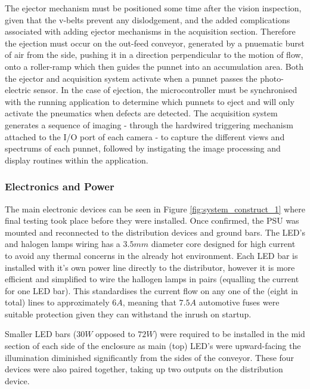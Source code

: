 \documentclass[fleqn,twoside]{article}
\begin{document}
The ejector mechanism must be positioned some time after the vision inspection, given that the v-belts prevent any dislodgement, and the added complications associated with adding ejector mechanisms in the acquisition section. Therefore the ejection must occur on the out-feed conveyor, generated by a pnuematic burst of air from the side, pushing it in a direction perpendicular to the motion of flow, onto a roller-ramp which then guides the punnet into an accumulation area. Both the ejector and acquisition system activate when a punnet passes the photo-electric sensor. In the case of ejection, the microcontroller must be synchronised with the running application to determine which punnets to eject and will only activate the pneumatics when defects are detected. The acquisition system generates a sequence of imaging - through the hardwired triggering mechanism attached to the I/O port of each camera - to capture the different views and spectrums of each punnet, followed by instigating the image processing and display routines within the application. 


\subsubsection{Electronics and Power}


The main electronic devices can be seen in Figure \ref{fig:system_construct_1} where final testing took place before they were installed. Once confirmed, the PSU was mounted and reconnected to the distribution devices and ground bars. The LED's and halogen lamps wiring has a $3.5mm$ diameter core designed for high current to avoid any thermal concerns in the already hot environment. Each LED bar is installed with it's own power line directly to the distributor, however it is more efficient and simplified to wire the hallogen lamps in pairs (equalling the current for one LED bar). This standardises the current flow on any one of the (eight in total) lines to approximately $6A$, meaning that $7.5A$ automotive fuses were suitable protection given they can withstand the inrush on startup. 

Smaller LED bars ($30W$ opposed to $72W$) were required to be installed in the mid section of each side of the enclosure as main (top) LED's were upward-facing the illumination diminished significantly from the sides of the conveyor. These four devices were also paired together, taking up two outputs on the distribution device. 
 
\end{document}

